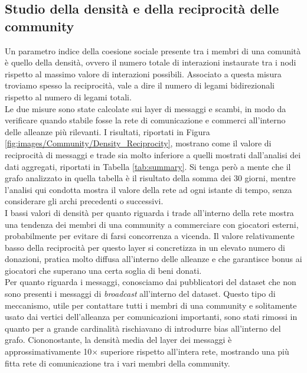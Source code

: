 \subsection{Studio della densità e della reciprocità delle community}
\label{sec:density}
Un parametro indice della coesione sociale presente tra i membri di una comunità è quello della densità, ovvero il numero totale di interazioni instaurate tra i nodi rispetto al massimo valore di interazioni possibili. Associato a questa misura troviamo spesso la reciprocità, vale a dire il numero di legami bidirezionali rispetto al numero di legami totali. \\
Le due misure sono state calcolate sui layer di messaggi e scambi, in modo da verificare quando stabile fosse la rete di comunicazione e commerci all'interno delle alleanze più rilevanti.
I risultati, riportati in Figura \ref{fig:images/Community/Density_Reciprocity}, mostrano come il valore di reciprocità di messaggi e trade sia molto inferiore a quelli mostrati dall'analisi dei dati aggregati, riportati in Tabella \ref{tab:summary}. Si tenga però a mente che il grafo analizzato in quella tabella è il risultato della somma dei 30 giorni, mentre l'analisi qui condotta mostra il valore della rete ad ogni istante di tempo, senza considerare gli archi precedenti o successivi.\\
I bassi valori di densità per quanto riguarda i trade all'interno della rete mostra una tendenza dei membri di una community a commerciare con giocatori esterni, probabilmente per evitare di farsi concorrenza a vicenda. Il valore relativamente basso della reciprocità per questo layer si concretizza in un elevato numero di donazioni, pratica molto diffusa all'interno delle alleanze e che garantisce bonus ai giocatori che superano una certa soglia di beni donati.\\
Per quanto riguarda i messaggi, conosciamo dai pubblicatori del dataset che non sono presenti i messaggi di \textit{broadcast} all'interno del dataset. Questo tipo di meccanismo, utile per contattare tutti i membri di una community e solitamente usato dai vertici dell'alleanza per comunicazioni importanti, sono stati rimossi in quanto per a grande cardinalità rischiavano di introdurre bias all'interno del grafo. Ciononostante, la densità media del layer dei messaggi è approssimativamente 10$\times$ superiore rispetto all'intera rete, mostrando una più fitta rete di comunicazione tra i vari membri della community.\\
